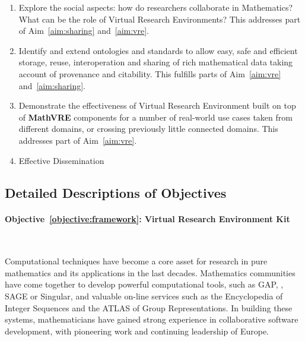 \documentclass[a4paper,11pt]{article}
\newcommand{\XX}{\textbf{MathVRE}\xspace}
\newcommand{\TheProject}{\XX}
\begin{document}
\begin{enumerate}
\item \label{objective:social}Explore the social aspects: how do researchers collaborate in
  Mathematics? What can be the role of Virtual Research Environments?
  This addresses part of Aim~\ref{aim:sharing} and~\ref{aim:vre}.

\item \label{objective:data}Identify and extend ontologies and standards to
  allow easy, safe and efficient storage, reuse, interoperation and sharing of rich mathematical
  data taking account of provenance and citability. This fulfills
  parts of Aim~\ref{aim:vre} and~\ref{aim:sharing}.

\item \label{objective:demo}Demonstrate the effectiveness of Virtual Research Environment
  built on top of \TheProject components for a number of real-world
  use cases taken from different domains, or crossing previously
  little connected domains. This addresses part of Aim~\ref{aim:vre}.

\item \label{objective:disseminate}Effective Dissemination

\end{enumerate}

\subsection*{Detailed Descriptions of Objectives} %

\paragraph{Objective~\ref{objective:framework}: Virtual Research
  Environment Kit}\ 

Computational techniques have become a core asset for research in pure
  mathematics and its applications in the last decades. Mathematics
  communities have come together to develop powerful computational
  tools, such as GAP, \PariGP, SAGE or Singular, and valuable on-line
  services such as the Encyclopedia of Integer Sequences and the ATLAS
  of Group Representations.  In building these systems, 
  mathematicians have gained strong
  experience in collaborative software development, with pioneering
  work and continuing leadership of Europe.
\end{document}
